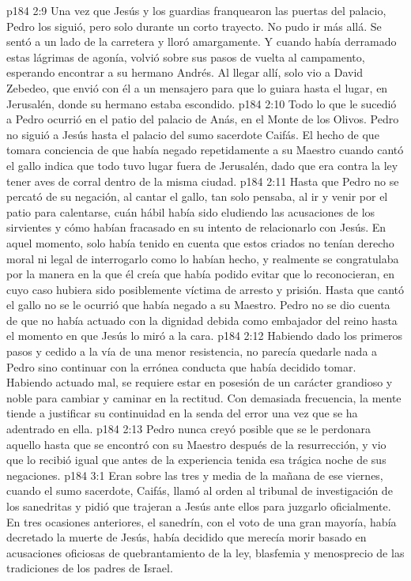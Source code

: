 \vs p184 2:9 Una vez que Jesús y los guardias franquearon las puertas del palacio, Pedro los siguió, pero solo durante un corto trayecto. No pudo ir más allá. Se sentó a un lado de la carretera y lloró amargamente. Y cuando había derramado estas lágrimas de agonía, volvió sobre sus pasos de vuelta al campamento, esperando encontrar a su hermano Andrés. Al llegar allí, solo vio a David Zebedeo, que envió con él a un mensajero para que lo guiara hasta el lugar, en Jerusalén, donde su hermano estaba escondido.
\vs p184 2:10 \pc Todo lo que le sucedió a Pedro ocurrió en el patio del palacio de Anás, en el Monte de los Olivos. Pedro no siguió a Jesús hasta el palacio del sumo sacerdote Caifás. El hecho de que tomara conciencia de que había negado repetidamente a su Maestro cuando cantó el gallo indica que todo tuvo lugar fuera de Jerusalén, dado que era contra la ley tener aves de corral dentro de la misma ciudad.
\vs p184 2:11 \pc Hasta que Pedro no se percató de su negación, al cantar el gallo, tan solo pensaba, al ir y venir por el patio para calentarse, cuán hábil había sido eludiendo las acusaciones de los sirvientes y cómo habían fracasado en su intento de relacionarlo con Jesús. En aquel momento, solo había tenido en cuenta que estos criados no tenían derecho moral ni legal de interrogarlo como lo habían hecho, y realmente se congratulaba por la manera en la que él creía que había podido evitar que lo reconocieran, en cuyo caso hubiera sido posiblemente víctima de arresto y prisión. Hasta que cantó el gallo no se le ocurrió que había negado a su Maestro. Pedro no se dio cuenta de que no había actuado con la dignidad debida como embajador del reino hasta el momento en que Jesús lo miró a la cara.
\vs p184 2:12 Habiendo dado los primeros pasos y cedido a la vía de una menor resistencia, no parecía quedarle nada a Pedro sino continuar con la errónea conducta que había decidido tomar. Habiendo actuado mal, se requiere estar en posesión de un carácter grandioso y noble para cambiar y caminar en la rectitud. Con demasiada frecuencia, la mente tiende a justificar su continuidad en la senda del error una vez que se ha adentrado en ella.
\vs p184 2:13 Pedro nunca creyó posible que se le perdonara aquello hasta que se encontró con su Maestro después de la resurrección, y vio que lo recibió igual que antes de la experiencia tenida esa trágica noche de sus negaciones.
\vs p184 3:1 Eran sobre las tres y media de la mañana de ese viernes, cuando el sumo sacerdote, Caifás, llamó al orden al tribunal de investigación de los sanedritas y pidió que trajeran a Jesús ante ellos para juzgarlo oficialmente. En tres ocasiones anteriores, el sanedrín, con el voto de una gran mayoría, había decretado la muerte de Jesús, había decidido que merecía morir basado en acusaciones oficiosas de quebrantamiento de la ley, blasfemia y menosprecio de las tradiciones de los padres de Israel.
